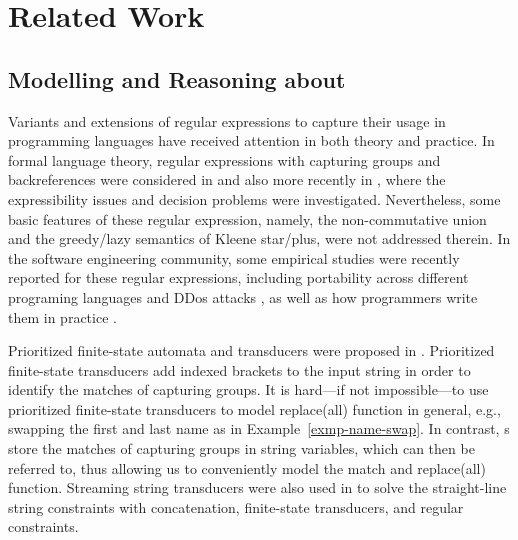 \section{Related Work}
\label{sec-related}



\subsection{Modelling and Reasoning about \regexp{}}

Variants and extensions of regular expressions to capture their usage in programming languages have received attention %
in both theory and practice. In formal language theory, regular expressions with capturing groups and backreferences were considered in \cite{CSY03,CN09} and also more recently in \cite{Freydenberger13,Schmid16,BM17b,FS19}, where the expressibility issues and decision problems were investigated. Nevertheless, some basic features of these regular expression, namely, the non-commutative union and the greedy/lazy semantics of Kleene star/plus, were not addressed therein. In the software engineering community, %
some empirical studies were recently reported for these regular expressions, including portability across different programing languages \cite{DMC+19} and DDos attacks \cite{SP18}, as well as how programmers write them in practice \cite{MDD+19}.


Prioritized finite-state automata and %
transducers were proposed in \cite{BM17}. Prioritized finite-state transducers add indexed brackets to the input string in order to identify the matches of capturing groups. It is hard---if not impossible---to use prioritized finite-state transducers to model replace(all) function in general, e.g., swapping the first and last name as in Example~\ref{exmp-name-swap}. In contrast, {\PSST}s store the matches of capturing groups in string variables, which can then be referred to, thus allowing us to conveniently model the match and replace(all) function. 
%
Streaming string transducers were also used in \cite{ZAM19} to solve the straight-line string constraints with concatenation, finite-state transducers, and regular constraints.

